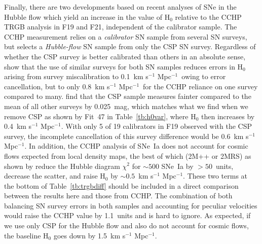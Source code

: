\documentclass[12pt]{aastex631}
\newcommand{\kms}{km s$^{-1}$ Mpc$^{-1}$}
\newcommand{\kmss }{km s$^{-1}$ Mpc$^{-1}$\ }
\begin{document}
Finally, there are two developments based on recent analyses of SNe in the Hubble flow which yield an increase in the value of H$_0$ relative to the CCHP TRGB analysis in F19 and F21, independent of the calibrator sample. The CCHP measurement relies on a {\it calibrator} SN sample from several SN surveys, but selects a {\it Hubble-flow} SN sample from only the CSP SN survey. Regardless of whether the CSP survey is better calibrated than others in an absolute sense, \citet{Brownsberger:2021} show that the use of similar surveys for both SN samples reduces errors in H$_0$ arising from survey miscalibration to 0.1~\kms\ owing to error cancellation, but to only 0.8~\kmss for the CCHP reliance on one survey compared to many.  \citet{Scolnic:2021} find that the CSP sample measures fainter compared to the mean of all other surveys by 0.025~mag, which matches what we find when we remove CSP as shown by Fit~47 in Table~\ref{tb:h0var}, where H$_0$ then increases by 0.4~\kms.  With only 5 of 19 calibrators in F19 observed with the CSP survey, the incomplete cancellation of this survey difference would be 0.6~\kms. In addition, the CCHP analysis of SNe~Ia does not account for cosmic flows expected from local density maps, the best of which (2M++ or 2MRS) as shown by \citet{Peterson:2021} reduce the Hubble diagram $\chi^2$ for $\sim 500$ SNe~Ia by $> 50$~units, decrease the scatter, and raise H$_0$ by $\sim 0.5$~\kms.  These two terms at the bottom of Table~\ref{tb:trgbdiff} should be included in a direct comparison between the results here and those from CCHP.  The combination of both balancing SN survey errors in both samples and accounting for peculiar velocities would raise the CCHP value by 1.1~units and is hard to ignore.   As expected, if we use only CSP for the Hubble flow and also do not account for cosmic flows, the baseline H$_0$ goes down by 1.5~\kms.  
\end{document}
